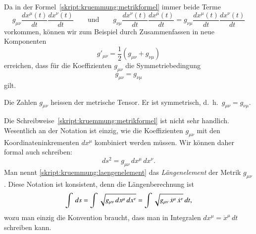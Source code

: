 Da in der Formel~\eqref{skript:kruemmung:metrikformel} immer beide Terme
\[
g_{\mu\nu} \frac{dx^\mu(t)}{dt} \frac{dx^\nu(t)}{dt}
\qquad\text{und}\qquad
g_{\nu\mu} \frac{dx^\nu(t)}{dt} \frac{dx^\mu(t)}{dt}
=
g_{\nu\mu} \frac{dx^\mu(t)}{dt} \frac{dx^\nu(t)}{dt}
\]
vorkommen, können wir zum Beispiel durch Zusammenfassen in neue Komponenten
\[
g'_{\mu\nu} = \frac12(g_{\mu\nu}+g_{\nu\mu})
\]
erreichen, dass für die Koeffizienten $g_{\mu\nu}$ die Symmetriebedingung
\[
g_{\mu\nu}=g_{\nu\mu}
\]
gilt.

\begin{definition}
Die Zahlen $g_{\mu\nu}$ heissen der metrische Tensor.
Er ist symmetrisch, d.~h.~$g_{\mu\nu}=g_{\nu\mu}$.
%
%
\end{definition}

Die Schreibweise~\eqref{skript:kruemmung:metrikformel} ist nicht
sehr handlich.
Wesentlich an der Notation ist einzig, wie die Koeffizienten $g_{\mu\nu}$
mit den Koordinateninkrementen $dx^\mu$ kombiniert werden müssen.
Wir können daher formal auch schreiben:
\begin{equation}
ds^2
=
g_{\mu\nu}\,dx^\mu\,dx^\nu.
\label{skript:kruemmung:laengenelement}
\end{equation}
Man nennt \eqref{skript:kruemmung:laengenelement} das {\em Längenelement}
der Metrik $g_{\mu\nu}$.
%
Diese Notation ist konsistent, denn die Längen\-berechnung ist
\begin{equation}
\int\,ds
=
\int \sqrt{g_{\mu\nu}\,dx^\mu\,dx^\nu}
=
\int \sqrt{\mathstrut g_{\mu\nu}\,\dot x^\mu\,\dot x^\nu}\,dt,
\label{skript:kruemmung:laengenformel}
\end{equation}
wozu man einzig die Konvention braucht, dass man in Integralen
$dx^\mu=\dot x^\mu\,dt$ schreiben kann.

